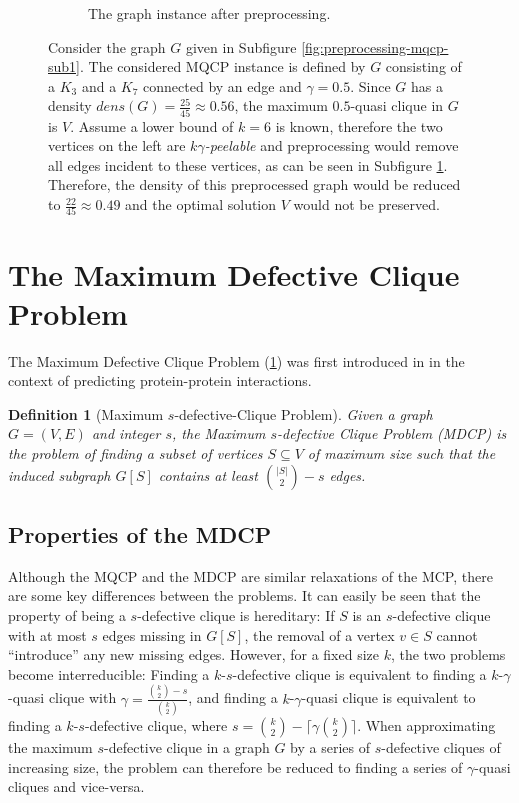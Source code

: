 \documentclass[draft,final]{vutinfth} %
\newtheorem{definition}{Definition}[section]
\begin{document}
\begin{figure}
\begin{subfigure}{.5\textwidth}
      \caption{The graph instance after preprocessing.}
      \label{fig:preprocessing-mqcp-sub2}
    \end{subfigure}
    \caption{Consider the graph $G$ given in Subfigure \ref{fig:preprocessing-mqcp-sub1}. The considered MQCP instance is defined by $G$ consisting of a $K_3$ and a $K_7$ connected by an edge and $\gamma=0.5$. Since $G$ has a density $dens(G) = \frac{25}{45} \approx 0.56$, the maximum $0.5$-quasi clique in $G$ is $V$. Assume a lower bound of $k=6$ is known, therefore the two vertices on the left are $k\gamma$\emph{-peelable} and preprocessing would remove all edges incident to these vertices, as can be seen in Subfigure \ref{fig:preprocessing-mqcp-sub2}. Therefore, the density of this preprocessed graph would be reduced to $\frac{22}{45} \approx 0.49$ and the optimal solution $V$ would not be preserved.}
    \label{fig:preprocessing-mqcp-counterexample}
\end{figure}

\section{The Maximum Defective Clique Problem}\label{sec:mdcp}

The Maximum Defective Clique Problem (\ref{def:mdcp}) was first introduced in \cite{Yu2006} in the context of predicting protein-protein interactions. 

\begin{definition}[Maximum $s$-defective-Clique Problem]
	\label{def:mdcp}
	Given a graph \\ 
    $G = (V,E)$ and integer $s$, the Maximum $s$-defective Clique Problem (MDCP) is the problem of finding a subset of vertices $S \subseteq V$ of maximum size 
	such that the induced subgraph $G[S]$ contains at least $\binom{|S|}{2} - s$ edges. 
\end{definition}

\subsection{Properties of the MDCP}

Although the MQCP and the MDCP are similar relaxations of the MCP, there are some key differences between the problems. It can easily be seen that the property of being a $s$-defective clique is hereditary: If $S$ is an $s$-defective clique with at most $s$ edges missing in $G[S]$, the removal of a vertex $v \in S$ cannot ``introduce'' any new missing edges.  
However, for a fixed size $k$, the two problems become interreducible: 
Finding a $k$-$s$-defective clique is equivalent to finding a $k$-$\gamma$-quasi clique with $\gamma = \frac{\binom{k}{2} - s}{\binom{k}{2}} $, and finding a $k$-$\gamma$-quasi clique is equivalent to finding a $k$-$s$-defective clique, where $s = \binom{k}{2} - \lceil \gamma \binom{k}{2} \rceil$. 
When approximating the maximum $s$-defective clique in a graph $G$ by a series of $s$-defective cliques of increasing size, the problem can therefore be reduced to finding a series of $\gamma$-quasi cliques and vice-versa.
\end{document}
